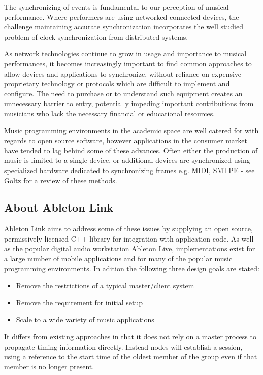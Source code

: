 \documentclass[11pt]{article} %
\theoremstyle{plain}
\theoremstyle{definition}
\begin{document}
The synchronizing of events is fundamental to our perception of musical
performance. Where performers are using networked connected devices, the
challenge maintaining accurate synchronization incorporates the well studied
problem of clock synchronization from distributed systems.

As network technologies continue to grow in usage and importance to musical
performances\cite{madgwick2015simple}, it becomes increasingly important to
find common approaches to allow devices and applications to synchronize, without
reliance on expensive proprietary technology or protocols which are difficult to
implement and configure. The need to purchase or to understand such equipment
creates an unnecessary barrier to entry, potentially impeding important
contributions from musicians who lack the necessary financial or educational
resources.

Music programming environments in the academic space are well catered for with
regards to open source software, however applications in the consumer market
have tended to lag behind some of these advances. Often either the production
of music is limited to a single device, or additional devices are synchronized
using specialized hardware dedicated to synchronizing frames e.g. MIDI, SMTPE -
see Goltz\cite{goltz2018ableton} for a review of these methods.


\subsection{About Ableton Link}

Ableton Link aims to address some of these issues by supplying an open source,
permissively licensed C++ library for integration with application code. As
well as the popular digital audio workstation Ableton Live, implementations
exist for a large number of mobile applications and for many of the popular
music programming environments. In adition the following three design goals are
stated\cite{goltz2018ableton}:

\begin{itemize}
  \item Remove the restrictions of a typical master/client system
  \item Remove the requirement for initial setup
  \item Scale to a wide variety of music applications
\end{itemize}

It differs from existing approaches in that it does not rely on a master
process to propagate timing information directly. Instead nodes will establish
a session, using a reference to the start time of the oldest member of the
group even if that member is no longer present.
\end{document}
